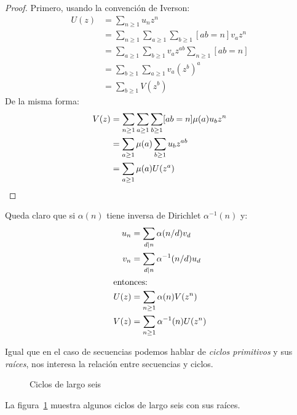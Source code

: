   \begin{proof}
    Primero,
    usando la convención de Iverson:%
    \begin{align*}
      U(z)
	&= \sum_{n \ge 1} u_n z^n \\
	&= \sum_{n \ge 1}
	     \sum_{a \ge 1} \sum_{b \ge 1} [a b = n] v_a z^n \\
	&= \sum_{a \ge 1} \sum_{b \ge 1} v_a z^{a b}
	     \sum_{n \ge 1} [a b = n] \\
	&= \sum_{b \ge 1} \sum_{a \ge 1} v_a (z^b)^a \\
	&= \sum_{b \ge 1} V(z^b)
     \end{align*}
     De la misma forma:
     \begin{align*}
       V(z)
	 &= \sum_{n \ge 1} \sum_{a \ge 1} \sum_{b \ge 1} [a b = n]
	      \mu(a) u_b z^n \\
	 &= \sum_{a \ge 1} \mu(a) \sum_{b \ge 1} u_b z^{a b} \\
	 &= \sum_{a \ge 1} \mu(a) U(z^a)
       \qedhere
     \end{align*}
  \end{proof}
  Queda claro que
  si \(\alpha(n)\) tiene inversa de Dirichlet \(\alpha^{-1}(n)\) y:
  \begin{align}
    u_n
      &= \sum_{d \mid n} \alpha(n / d) v_d \notag \\
    v_n
      &= \sum_{d \mid n} \alpha^{-1}(n / d) u_d \notag \\
    \intertext{entonces:}
    U(z)
      &= \sum_{n \ge 1} \alpha(n) V(z^n)
	     \label{eq:Dirichlet-sum-gf} \\
    V(z)
      &= \sum_{n \ge 1} \alpha^{-1}(n) U(z^n)
	     \label{eq:Dirichlet-inversion-gf}
  \end{align}

  Igual que en el caso de secuencias
  podemos hablar de \emph{ciclos primitivos}%
  y sus \emph{raíces},
  nos interesa la relación entre secuencias y ciclos.
  \begin{figure}[ht]
    \centering
    \hspace{3em}%
    \hspace{3em}%
    \hspace{3em}%
    \caption{Ciclos de largo seis}
    \label{fig:6cycles}
  \end{figure}
  La figura~\ref{fig:6cycles} muestra algunos ciclos de largo seis
  con sus raíces.

